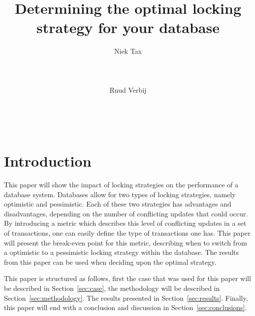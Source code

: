 \documentclass{sig-alternate-br}
\begin{document}

\title{Determining the optimal locking strategy for your database}

\author{
\alignauthor Niek Tax\\
       \\
       \\
       \\
\alignauthor Ruud Verbij\\
       \\
       \\
       \\
}

\maketitle
\begin{abstract}
\end{abstract}

\keywords{}

\section{Introduction}
\label{sec:intro}
This paper will show the impact of locking strategies on the performance of a database system. Databases allow for two types of locking strategies, namely optimistic and pessimistic. Each of these two strategies has advantages and disadvantages, depending on the number of conflicting updates that could occur. By introducing a metric which describes this level of conflicting updates in a set of transactions, one can easily define the type of transactions one has. This paper will present the break-even point for this metric, describing when to switch from a optimistic to a pessimistic locking strategy within the database. The results from this paper can be used when deciding upon the optimal strategy.

This paper is structured as follows, first the case that was used for this paper will be described in Section~\ref{sec:case}, the methodology will be described in Section~\ref{sec:methodology}. The results presented in Section~\ref{sec:results}. Finally, this paper will end with a conclusion and discussion in Section~\ref{sec:conclusions}.

\end{document}
